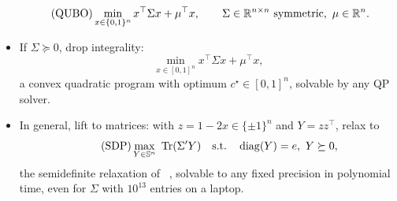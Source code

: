 \documentclass[handoutsbeamer.tex]{subfiles}
\begin{document}
\begin{frame}
\begin{equation}\label{eq:ch10:qubo}\tag{QUBO}
    \min_{x \in \{0,1\}^n} x^\top\Sigma x + \mu^\top x, \qquad \Sigma \in \mathbb{R}^{n\times n}\text{ symmetric},\ \mu\in\mathbb{R}^n.
\end{equation}
\begin{itemize}\setlength\itemsep{0.2em}
    \item If $\Sigma \succeq 0$, drop integrality:
    \begin{equation}\label{eq:ch10:qp}\tag{QP}
        \min_{x\in[0,1]^n} x^\top\Sigma x + \mu^\top x,
    \end{equation}
    a convex quadratic program with optimum $c^\star \in [0,1]^n$, solvable by any QP solver.
    \item In general, lift to matrices: with $z = 1-2x \in \{\pm1\}^n$ and $Y = zz^\top$, relax to
    \begin{equation}\label{eq:ch10:sdp}\tag{SDP}
        \max_{Y \in \mathbb S^n}\ \operatorname{Tr}(\Sigma' Y)\quad\text{s.t.}\quad \operatorname{diag}(Y) = e,\ Y \succeq 0,
    \end{equation}
    the semidefinite relaxation of \Chap~, solvable to any fixed precision in polynomial time, even for $\Sigma$ with $10^{13}$ entries on a laptop.
\end{itemize}
\end{frame}
\end{document}
